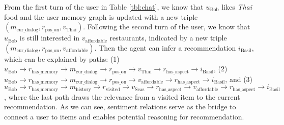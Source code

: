 \documentclass[11pt,a4paper]{article}
\begin{document}
From the first turn of the user in Table \ref{tbl:chat}, we know that $u_\text{Bob}$ likes \textit{Thai} food and the user memory graph is updated with a new triple $(m_\text{cur\_dialog}, r_\text{pos\_on}, v_\text{Thai})$.
Following the second turn of the user, we know that $u_\text{Bob}$ is still interested in $v_\text{affordable}$ restaurants, indicated by a new triple $(m_\text{cur\_dialog}, r_\text{pos\_on}, v_\text{affordable})$.
Then the agent can infer a recommendation $i_{\text{Basil}}$, which can be explained by paths: 
(1) $u_\text{Bob} \rightarrow r_\text{has\_memory} \rightarrow m_\text{cur\_dialog} \rightarrow r_\text{pos\_on} \rightarrow v_\text{Thai} \rightarrow r_\text{has\_aspect} \rightarrow i_\text{Basil}$, 
(2) $u_\text{Bob} \rightarrow r_\text{has\_memory} \rightarrow m_\text{cur\_dialog} \rightarrow r_\text{pos\_on} \rightarrow v_\text{affordable} \rightarrow r_\text{has\_aspect} \rightarrow i_\text{Basil}$, 
and (3) $ u_\text{Bob} \rightarrow r_\text{has\_memory} \rightarrow m_\text{history} \rightarrow r_\text{visited} \rightarrow v_\text{Seas} \rightarrow r_\text{has\_aspect} \rightarrow v_\text{affordable} \rightarrow r_\text{has\_aspect} \rightarrow i_\text{Basil}$, where the last path draws the relevance from a visited item to the current recommendation. 
As we can see, sentiment relations serve as the bridge to connect a user to items and enables potential reasoning for recommendation.

\begin{table}
    \centering
    \vspace{-2pt}
    \caption{An example dialog corresponds to the graph updates in Figure \ref{fig:cum}.} 
    \vspace{-10pt}
\label{tbl:chat}
\end{table}
\end{document}
